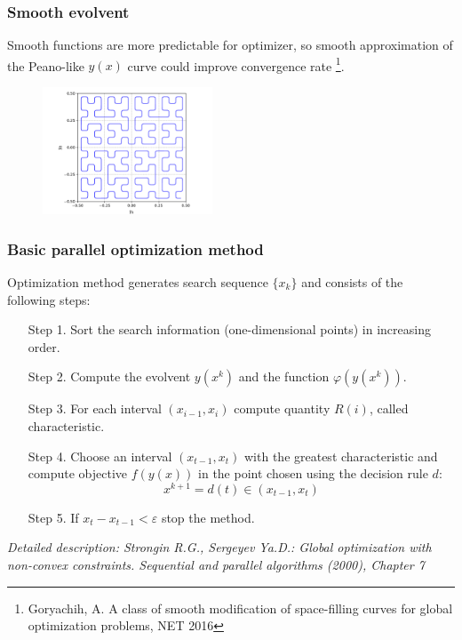 \documentclass[aspectratio=1610]{beamer}
\begin{document}
\begin{frame}
  \frametitle{Smooth evolvent}
  Smooth functions are more predictable for optimizer, so smooth approximation of the Peano-like \(y(x)\) curve could improve convergence rate \footnote{Goryachih, A. A class of smooth modification of space-filling curves for global optimization problems, NET 2016}.
  \begin{figure}[ht]
    \includegraphics[width=0.45\textwidth]{smooth.pdf}
  \end{figure}

\end{frame}

\begin{frame}
  \frametitle{Basic parallel optimization method}
  Optimization method generates search sequence \(\{x_k\}\) and consists of the following steps:
  \begin{enumerate}
    \setlength{\itemindent}{.1in}
    \item[Step 1.] Sort the search information (one-dimensional points) in increasing order.
    \item[Step 2.] Compute the evolvent \(y(x^k)\) and the function \(\varphi(y(x^k))\).
    \item[Step 3.] For each interval \((x_{i-1}, x_i)\) compute quantity \(R(i)\), called characteristic.
    \item[Step 4.] Choose an interval \((x_{t-1}, x_t)\) with the greatest characteristic and
    compute objective \(f(y(x))\) in the point chosen using the decision rule \(d\):
    \begin{displaymath}
      x^{k+1}=d(t)\in (x_{t-1}, x_t)
    \end{displaymath}
    \item[Step 5.] If \(x_{t}-x_{t-1}<\varepsilon\) stop the method.
  \end{enumerate}
  \textit{\footnotesize	{Detailed description: Strongin R.G., Sergeyev Ya.D.: Global optimization with non-convex constraints. Sequential and parallel algorithms (2000), Chapter 7}}
\end{frame}
\end{document}
